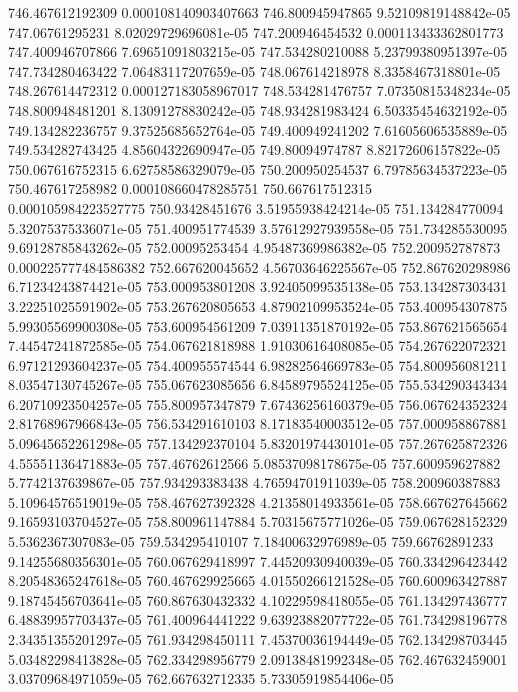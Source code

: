{746.467612192309 0.000108140903407663
746.800945947865 9.52109819148842e-05
747.06761295231 8.02029729696081e-05
747.200946454532 0.000113433362801773
747.400946707866 7.69651091803215e-05
747.534280210088 5.23799380951397e-05
747.734280463422 7.06483117207659e-05
748.067614218978 8.3358467318801e-05
748.267614472312 0.000127183058967017
748.534281476757 7.07350815348234e-05
748.800948481201 8.13091278830242e-05
748.934281983424 6.50335454632192e-05
749.134282236757 9.37525685652764e-05
749.400949241202 7.61605606535889e-05
749.534282743425 4.85604322690947e-05
749.80094974787 8.82172606157822e-05
750.067616752315 6.62758586329079e-05
750.200950254537 6.79785634537223e-05
750.467617258982 0.000108660478285751
750.667617512315 0.000105984223527775
750.93428451676 3.51955938424214e-05
751.134284770094 5.32075375336071e-05
751.400951774539 3.57612927939558e-05
751.734285530095 9.69128785843262e-05
752.00095253454 4.95487369986382e-05
752.200952787873 0.000225777484586382
752.667620045652 4.56703646225567e-05
752.867620298986 6.71234243874421e-05
753.000953801208 3.92405099535138e-05
753.134287303431 3.22251025591902e-05
753.267620805653 4.87902109953524e-05
753.400954307875 5.99305569900308e-05
753.600954561209 7.03911351870192e-05
753.867621565654 7.44547241872585e-05
754.067621818988 1.91030616408085e-05
754.267622072321 6.97121293604237e-05
754.400955574544 6.98282564669783e-05
754.800956081211 8.03547130745267e-05
755.067623085656 6.84589795524125e-05
755.534290343434 6.20710923504257e-05
755.800957347879 7.67436256160379e-05
756.067624352324 2.81768967966843e-05
756.534291610103 8.17183540003512e-05
757.000958867881 5.09645652261298e-05
757.134292370104 5.83201974430101e-05
757.267625872326 4.55551136471883e-05
757.46762612566 5.08537098178675e-05
757.600959627882 5.7742137639867e-05
757.934293383438 4.76594701911039e-05
758.200960387883 5.10964576519019e-05
758.467627392328 4.21358014933561e-05
758.667627645662 9.16593103704527e-05
758.800961147884 5.70315675771026e-05
759.067628152329 5.5362367307083e-05
759.534295410107 7.18400632976989e-05
759.66762891233 9.14255680356301e-05
760.067629418997 7.44520930940039e-05
760.334296423442 8.20548365247618e-05
760.467629925665 4.01550266121528e-05
760.600963427887 9.18745456703641e-05
760.867630432332 4.10229598418055e-05
761.134297436777 6.48839957703437e-05
761.400964441222 9.63923882077722e-05
761.734298196778 2.34351355201297e-05
761.934298450111 7.45370036194449e-05
762.134298703445 5.03482298413828e-05
762.334298956779 2.09138481992348e-05
762.467632459001 3.03709684971059e-05
762.667632712335 5.73305919854406e-05
}
